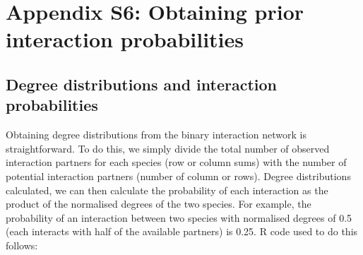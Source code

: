 \documentclass[12pt]{article}
\begin{document}
\clearpage

\section*{Appendix S6: Obtaining prior interaction probabilities}

    \subsection*{Degree distributions and interaction probabilities}

      Obtaining degree distributions from the binary interaction 
      network is straightforward. To do this, we simply divide the 
      total number of observed interaction partners for each 
      species (row or column sums) with the number of potential 
      interaction partners (number of column or rows). Degree 
      distributions calculated, we can then calculate the 
      probability of each interaction as the product of the 
      normalised degrees of the two species. For example, the 
      probability of an interaction between two species with 
      normalised degrees of 0.5 (each interacts with half of the 
      available partners) is 0.25. R code used to do this follows:
\end{document}

